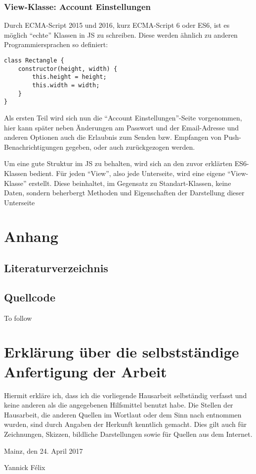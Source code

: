 \documentclass[a4paper,12pt]{scrartcl}      %
\begin{document}
	\subsubsection{View-Klasse: Account Einstellungen}
	Durch ECMA-Script 2015 und 2016, kurz ECMA-Script 6 oder ES6, ist es möglich ``echte'' Klassen in JS zu schreiben. Diese werden ähnlich zu anderen Programmiersprachen so definiert:\par
	\begin{verbatim}
class Rectangle {
    constructor(height, width) {
        this.height = height;
        this.width = width;
    }
}
	\end{verbatim}
	Als ersten Teil wird sich nun die ``Account Einstellungen''-Seite vorgenommen, hier kann später neben Änderungen am Passwort und der Email-Adresse und anderen Optionen auch die Erlaubnis zum Senden bzw. Empfangen von Push-Benachrichtigungen gegeben, oder auch zurückgezogen werden.\par
	Um eine gute Struktur im JS zu behalten, wird sich an den zuvor erklärten ES6-Klassen bedient. Für jeden ``View'', also jede Unterseite, wird eine eigene ``View-Klasse'' erstellt. Diese beinhaltet, im Gegensatz zu Standart-Klassen, keine Daten, sondern beherbergt Methoden und Eigenschaften der Darstellung dieser Unterseite
	\newpage
	\section{Anhang}
	\subsection{Literaturverzeichnis}
	\printbibliography[heading=none]
	
	\subsection{Quellcode}
	To follow
	
	\newpage
	\section{Erklärung über die selbstständige Anfertigung der Arbeit}
	Hiermit erkläre ich, dass ich die vorliegende Hausarbeit selbständig verfasst und keine anderen als die angegebenen Hilfsmittel benutzt habe.
	Die Stellen der Hausarbeit, die anderen Quellen im Wortlaut oder dem Sinn nach entnommen wurden, sind durch Angaben der Herkunft kenntlich gemacht. Dies gilt auch für Zeichnungen, Skizzen, bildliche Darstellungen sowie für Quellen aus dem Internet.\par
	\vspace{0.5cm}
	\noindent Mainz, den 24. April 2017\par
	\vspace{2cm}
	\noindent Yannick F\'{e}lix
	\vfill
	\doclicenseThis
\end{document}
